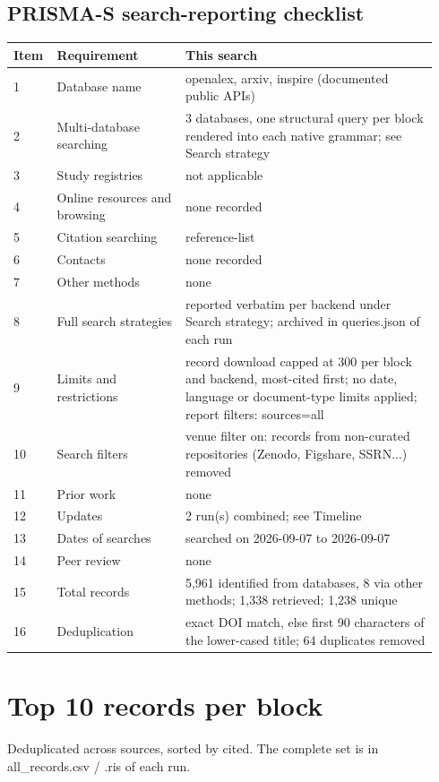 \documentclass[10pt,a4paper]{article}
\begin{document}
\subsection*{PRISMA-S search-reporting checklist}
{\scriptsize\begin{longtable}{p{0.072\linewidth}p{0.296\linewidth}p{0.574\linewidth}}
\hline
\textbf{Item} & \textbf{Requirement} & \textbf{This search} \\ \hline
\endhead
1 & Database name & openalex, arxiv, inspire (documented public APIs) \\
2 & Multi-database searching & 3 databases, one structural query per block rendered into each native grammar; see Search strategy \\
3 & Study registries & not applicable \\
4 & Online resources and browsing & none recorded \\
5 & Citation searching & reference-list \\
6 & Contacts & none recorded \\
7 & Other methods & none \\
8 & Full search strategies & reported verbatim per backend under Search strategy; archived in queries.json of each run \\
9 & Limits and restrictions & record download capped at 300 per block and backend, most-cited first; no date, language or document-type limits applied; report filters: sources=all \\
10 & Search filters & venue filter on: records from non-curated repositories (Zenodo, Figshare, SSRN...) removed \\
11 & Prior work & none \\
12 & Updates & 2 run(s) combined; see Timeline \\
13 & Dates of searches & searched on 2026-09-07 to 2026-09-07 \\
14 & Peer review & none \\
15 & Total records & 5,961 identified from databases, 8 via other methods; 1,338 retrieved; 1,238 unique \\
16 & Deduplication & exact DOI match, else first 90 characters of the lower-cased title; 64 duplicates removed \\
\hline
\end{longtable}}
\section*{Top 10 records per block}
Deduplicated across sources, sorted by cited. The complete set is in all\_records.csv / .ris of each run.
\end{document}
